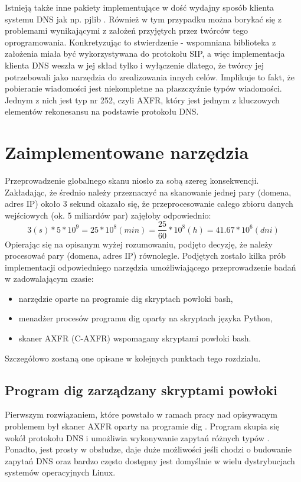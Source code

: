 Istnieją także inne pakiety implementujące w dość wydajny sposób klienta systemu DNS jak np. pjlib \cite{pjlib}. Również w tym
przypadku można borykać się z problemami wynikającymi z założeń przyjętych przez twórców tego oprogramowania. Konkretyzując to
stwierdzenie - wspomniana biblioteka z założenia miała być wykorzystywana do protokołu SIP, a więc implementacja klienta DNS
weszła w jej skład tylko i wyłączenie dlatego, że twórcy jej potrzebowali jako narzędzia do zrealizowania innych celów.
Implikuje to fakt, że pobieranie wiadomości jest niekompletne na płaszczyźnie typów wiadomości. Jednym z nich jest typ nr 252,
czyli AXFR, który jest jednym z kluczowych elementów rekonesansu na podstawie protokołu DNS.

\section{Zaimplementowane narzędzia}
Przeprowadzenie globalnego skanu niosło za sobą szereg konsekwencji. Zakładając, że średnio należy przeznaczyć na skanowanie
jednej pary (domena, adres IP) około 3 sekund okazało się, że przeprocesowanie całego zbioru danych wejściowych (ok. 5 miliardów
par) zajęłoby odpowiednio:
$$3(s) * 5 * 10^{9} = 25 * 10^{8}(min) = \frac{25}{60} * 10^{8}(h) = 41.67 * 10^{6} (dni)\label{obliczenia}$$
Opierając się na opisanym wyżej rozumowaniu, podjęto decyzję, że należy procesować pary (domena, adres IP) równolegle.
Podjętych zostało kilka prób implementacji odpowiedniego narzędzia umożliwiającego przeprowadzenie badań w zadowalającym czasie:
\begin{itemize}
	\item narzędzie oparte na programie dig skryptach powłoki bash,
	\item menadżer procesów programu dig oparty na skryptach języka Python,
	\item skaner AXFR (C-AXFR) wspomagany skryptami powłoki bash.
\end{itemize}
Szczegółowo zostaną one opisane w kolejnych punktach tego rozdziału.

\subsection{Program dig zarządzany skryptami powłoki}
Pierwszym rozwiązaniem, które powstało w ramach pracy nad opisywanym problemem był skaner AXFR oparty na programie
dig \cite{isc}. Program skupia się wokół protokołu DNS i umożliwia wykonywanie zapytań różnych typów \cite{Liu:2006:DB:1197828}.
Ponadto, jest prosty w obsłudze, daje duże możliwości jeśli chodzi o budowanie zapytań DNS oraz bardzo często dostępny jest
domyślnie w wielu dystrybucjach systemów operacyjnych Linux.

